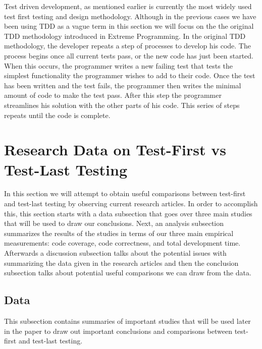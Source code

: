 \documentclass{sig-alternate}
\begin{document}
Test driven development, as mentioned earlier is currently the most widely used test first testing and design methodology.  Although in the previous cases we have been using TDD as a vague term in this section we will focus on the the original TDD methodology introduced in Extreme Programming.  In the original TDD methodology, the developer repeats a step of processes to develop his code.  The process begins once all current tests pass, or the new code has just been started.  When this occurs, the programmer writes a new failing test that tests the simplest functionality the programmer wishes to add to their code.  Once the test has been written and the test fails, the programmer then writes the minimal amount of code to make the test pass.  After this step the programmer streamlines his solution with the other parts of his code.  This series of steps repeats until the code is complete.

\section{Research Data on Test-First vs Test-Last Testing}
In this section we will attempt to obtain useful comparisons between test-first and test-last testing by observing current research articles.  In order to accomplish this, this section starts with a data subsection that goes over three main studies that will be used to draw our conclusions.  Next, an analysis subsection summarizes the results of the studies in terms of our three main empirical measurements: code coverage, code correctness, and total development time.  Afterwards a discussion subsection talks about the potential issues with summarizing the data given in the research articles and then the conclusion subsection talks about potential useful comparisons we can draw from the data. 

\subsection{Data}

This subsection contains summaries of important studies that will be used later in the paper to draw out important conclusions and comparisons between test-first and test-last testing.
\end{document}
